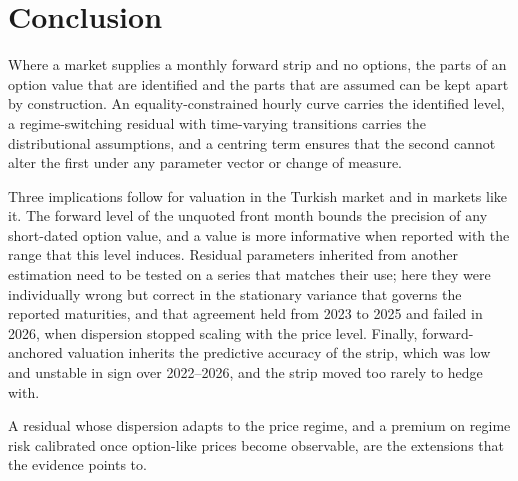 \section{Conclusion}
\label{sec:conclusion}

Where a market supplies a monthly forward strip and no options, the parts of
an option value that are identified and the parts that are assumed can be kept
apart by construction. An equality-constrained hourly curve carries the
identified level, a regime-switching residual with time-varying transitions
carries the distributional assumptions, and a centring term ensures that the
second cannot alter the first under any parameter vector or change of measure.

Three implications follow for valuation in the Turkish market and in markets
like it. The forward level of the unquoted front month bounds the precision of
any short-dated option value, and a value is more informative when reported
with the range that this level induces. Residual parameters inherited from
another estimation need to be tested on a series that matches their use; here
they were individually wrong but correct in the stationary variance that
governs the reported maturities, and that agreement held from 2023 to 2025 and
failed in 2026, when dispersion stopped scaling with the price level. Finally,
forward-anchored valuation inherits the predictive accuracy of the strip, which
was low and unstable in sign over 2022--2026, and the strip moved too rarely to
hedge with.

A residual whose dispersion adapts to the price regime, and a premium on
regime risk calibrated once option-like prices become observable, are the
extensions that the evidence points to.
